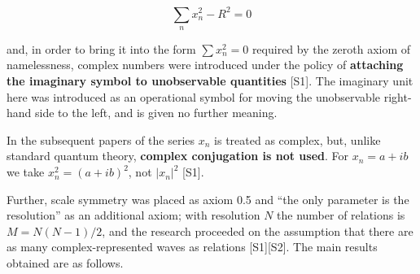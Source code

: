 \documentclass[
  10pt,
]{article}
\begin{document}
\[\sum_n x_n^2 - R^2 = 0\]

and, in order to bring it into the form \(\sum x_n^2 = 0\) required by
the zeroth axiom of namelessness, complex numbers were introduced under
the policy of \textbf{attaching the imaginary symbol to unobservable
quantities} {[}S1{]}. The imaginary unit here was introduced as an
operational symbol for moving the unobservable right-hand side to the
left, and is given no further meaning.

In the subsequent papers of the series \(x_n\) is treated as complex,
but, unlike standard quantum theory, \textbf{complex conjugation is not
used}. For \(x_n = a + ib\) we take \(x_n^2 = (a+ib)^2\), not
\(|x_n|^2\) {[}S1{]}.

Further, scale symmetry was placed as axiom 0.5 and ``the only parameter
is the resolution'' as an additional axiom; with resolution \(N\) the
number of relations is \(M = N(N-1)/2\), and the research proceeded on
the assumption that there are as many complex-represented waves as
relations {[}S1{]}{[}S2{]}. The main results obtained are as follows.
\end{document}

